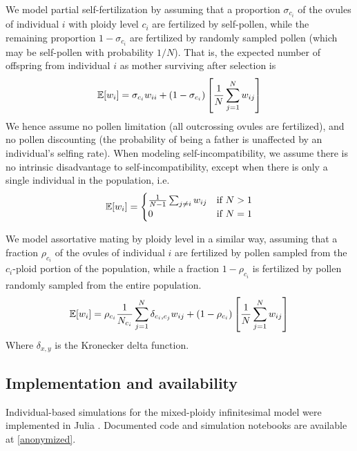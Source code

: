 \documentclass[12pt,a4paper]{article}
\begin{document}
    We model partial self-fertilization by assuming that a proportion
    $\sigma_{c_i}$ of the ovules of individual $i$ with ploidy level $c_i$ are
    fertilized by self-pollen, while the remaining proportion $1-\sigma_{c_i}$ are
    fertilized by randomly sampled pollen (which may be self-pollen with
    probability $1/N$). 
    That is, the expected number of offspring from individual $i$ as mother
    surviving after selection is
    \begin{equation}
    \mathbb{E}[w_i] = \sigma_{c_i} w_{ii} +
      (1-\sigma_{c_i})\left[\frac{1}{N}\sum_{j=1}^N w_{ij}\right]
    \end{equation}
    We hence assume no pollen limitation (all outcrossing ovules are fertilized),
    and no pollen discounting (the probability of being a father is unaffected by
    an individual's selfing rate).
    When modeling self-incompatibility, we assume there is no intrinsic
    disadvantage to self-incompatibility, except when there is only a single
    individual in the population, i.e.
    \begin{equation}
    \mathbb{E}[w_i] = \begin{cases}
        \frac{1}{N-1}\sum_{j \ne i }w_{ij} & \text{if } N > 1\\ 
        0 & \text{if } N=1 \end{cases}
    \end{equation}

    We model assortative mating by ploidy level in a similar way, assuming that a
    fraction $\rho_{c_i}$ of the ovules of individual $i$ are fertilized by pollen
    sampled from the $c_i$-ploid portion of the population, while a fraction
    $1-\rho_{c_i}$ is fertilized by pollen randomly sampled from the entire
    population.
    \begin{equation}
    \mathbb{E}[w_i] = \rho_{c_i} \frac{1}{N_{c_{i}}} \sum_{j=1}^N \delta_{c_i,c_j}w_{ij}
     + (1-\rho_{c_i})
    \left[\frac{1}{N}\sum_{j=1}^N w_{ij}\right]
    \end{equation}
    Where $\delta_{x,y}$ is the Kronecker delta function.

    \subsection*{Implementation and availability}

    Individual-based simulations for the mixed-ploidy infinitesimal model were
    implemented in Julia \citep{julia}.
    Documented code and simulation notebooks are available at \url{[anonymized]}.
\end{document}
